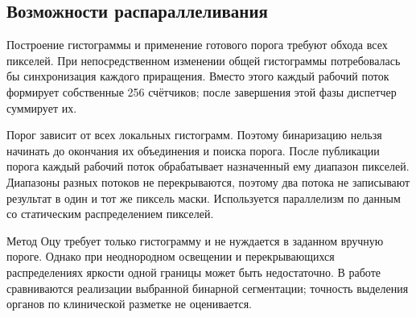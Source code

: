 \subsection{Возможности распараллеливания}
Построение гистограммы и применение готового порога требуют обхода всех пикселей. При непосредственном изменении общей гистограммы потребовалась бы синхронизация каждого приращения. Вместо этого каждый рабочий поток формирует собственные 256 счётчиков; после завершения этой фазы диспетчер суммирует их.

Порог зависит от всех локальных гистограмм. Поэтому бинаризацию нельзя начинать до окончания их объединения и поиска порога. После публикации порога каждый рабочий поток обрабатывает назначенный ему диапазон пикселей. Диапазоны разных потоков не перекрываются, поэтому два потока не записывают результат в один и тот же пиксель маски. Используется параллелизм по данным со статическим распределением пикселей.

Метод Оцу требует только гистограмму и не нуждается в заданном вручную пороге. Однако при неоднородном освещении и перекрывающихся распределениях яркости одной границы может быть недостаточно. В работе сравниваются реализации выбранной бинарной сегментации; точность выделения органов по клинической разметке не оценивается.
